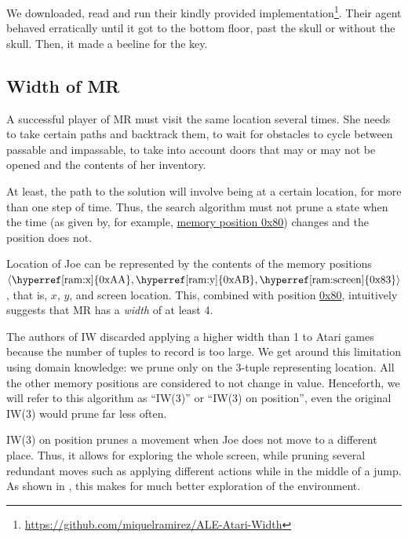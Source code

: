 We downloaded, read and run their kindly provided
implementation\footnote{\href{https://github.com/miquelramirez/ALE-Atari-Width}{https://github.com/miquelramirez/ALE-Atari-Width}}.
Their agent behaved erratically until it got to the bottom floor, past the skull
or without the skull. Then, it made a beeline for the key.

\subsection{Width of \acl{MR}}
A successful player of \ac{MR} must visit the same location several times. She
needs to take certain paths and backtrack them, to wait for obstacles to cycle
between passable and impassable, to take into account doors that may or may not
be opened and the contents of her inventory.

At least, the path to the solution will involve being at a certain location, for
more than one step of time. Thus, the search algorithm must not prune a state
when the time (as given by, for example, \hyperref[ram:frame]{memory position 0x80})
changes and the position does not.

\newcommand{\ram}[2]{\hyperref[ram:#1]{#2}}

Location of Joe can be represented by the contents of the memory positions
$\langle\text{\hyperref[ram:x]{0xAA}},
\text{\hyperref[ram:y]{0xAB}},
\text{\hyperref[ram:screen]{0x83}}\rangle$,
that is, $x$, $y$, and screen location. This, combined with position
\hyperref[ram:frame]{0x80}, intuitively suggests that \ac{MR} has a \emph{width}
of at least 4.

The authors of \ac{IW} discarded applying a higher width than 1 to Atari games
because the number of tuples to record is too large. We get around this limitation
using domain knowledge: we prune only on the 3-tuple representing location. All
the other memory positions are considered to not change in value. Henceforth, we
will refer to this algorithm as ``\ac{IW}(3)'' or ``\ac{IW}(3) on position'',
even the original \ac{IW}(3) would prune far less often.

\ac{IW}(3) on position prunes a movement when Joe does not move to a different
place. Thus, it allows for exploring the whole screen, while pruning several
redundant moves such as applying different actions while in the middle of a jump.
As shown in , this makes for much better exploration of the
environment.

